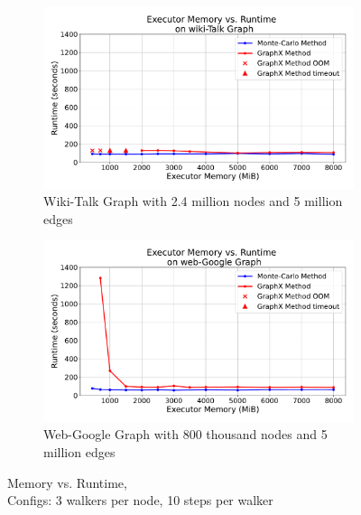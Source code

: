 \begin{figure}[H]
    \centering
    \begin{subfigure}[t]{0.5\linewidth}
        \centering
        \includegraphics[width=\linewidth]{images/plots/wiki-Talk/memory_vs_runtime_wiki_talk.pdf}
        \caption{Wiki-Talk Graph with 2.4 million nodes and 5 million edges}
        \label{fig:wikirun}
    \end{subfigure}\hfill
    \begin{subfigure}[t]{0.5\linewidth}
        \centering
        \includegraphics[width=\linewidth]{images/plots/web-Google/memory_vs_runtime_web_google.pdf}
        \caption{Web-Google Graph with 800 thousand      nodes and 5 million edges}
        \label{fig:wikigibhrs}
    \end{subfigure}
    \caption{Memory vs. Runtime,\\Configs: 3 walkers per node, 10 steps per walker}
    \label{fig:wiki-comparison}
\end{figure}

